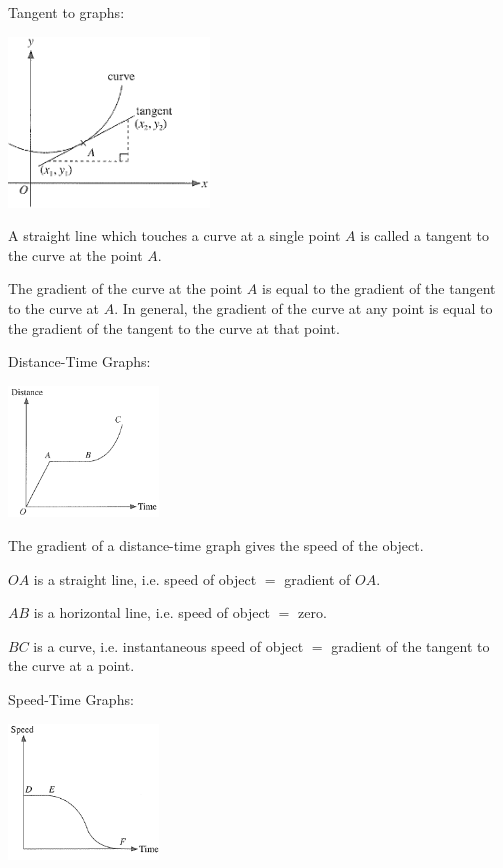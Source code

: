\documentclass[twocolumn]{article}
\begin{document}
\begin{enumerate}
\bigskip 

\noindent 
Tangent to graphs:

\includegraphics[width=0.4\textwidth]{12.png}

\bigskip 

\noindent 
A straight line which touches a curve at a single point $A$ is called a tangent to the curve at the point $A$.

\bigskip 

\noindent 
The gradient of the curve at the point $A$ is equal to the gradient of the tangent to the curve at $A$. In general, the gradient of the curve at any point is equal to the gradient of the tangent to the curve at that point.

\bigskip 

\noindent 
Distance-Time Graphs:

\includegraphics[width=0.3\textwidth]{13.png}

\noindent 
The gradient of a distance-time graph gives the speed of the object.

\noindent 
$O A$ is a straight line, i.e. speed of object $=$ gradient of $O A$.

\noindent 
$A B$ is a horizontal line, i.e. speed of object $=$ zero.

\noindent 
$B C$ is a curve, i.e. instantaneous speed of object $=$ gradient of the tangent to the curve at a point.

\bigskip 

\noindent 
Speed-Time Graphs:

\includegraphics[width=0.3\textwidth]{14.png}


\end{enumerate}
\end{document}
